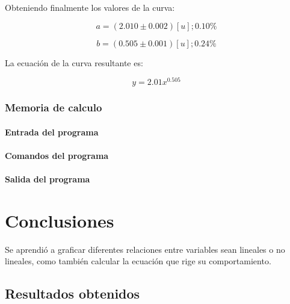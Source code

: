 \documentclass[letter,11pt]{article}
\begin{document}
Obteniendo finalmente los valores de la curva:

\begin{equation}
    a = (2.010 \pm 0.002)[u];0.10\%
\end{equation}

\begin{equation}
    b = (0.505 \pm 0.001)[u];0.24\%
\end{equation}

La ecuación de la curva resultante es:

\begin{equation}
    y = 2.01 x^{0.505}
\end{equation}

\subsubsection{Memoria de calculo}

\paragraph{Entrada del programa}
\begin{alltt}
\footnotesize

\normalsize
\end{alltt}

\paragraph{Comandos del programa}
\begin{alltt}
\footnotesize

\normalsize
\end{alltt}

\paragraph{Salida del programa}
\begin{alltt}
\footnotesize

\normalsize
\end{alltt}

\section{Conclusiones}
Se aprendió a graficar diferentes relaciones entre variables sean lineales o
no lineales, como también calcular la ecuación que rige su comportamiento.

\subsection{Resultados obtenidos}
\end{document}
